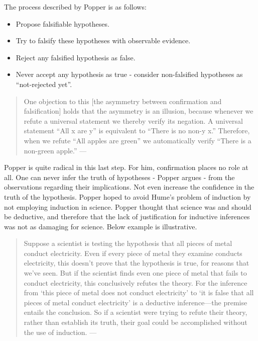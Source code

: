 \documentclass[
  12pt,
]{book}
\providecommand{\tightlist}{%
  \setlength{\itemsep}{0pt}\setlength{\parskip}{0pt}}
\begin{document}
The process described by Popper is as follows:

\begin{itemize}
\tightlist
\item
  Propose falsifiable hypotheses.
\item
  Try to falsify these hypotheses with observable evidence.
\item
  Reject any falsified hypothesis as false.
\item
  Never accept any hypothesis as true - consider non-falsified hypotheses as ``not-rejected yet''.
\end{itemize}

\begin{quote}
One objection to this {[}the asymmetry between confirmation and falsification{]} holds that the asymmetry is an illusion, because whenever we refute a universal statement we thereby verify its negation. A universal statement ``All x are y'' is equivalent to ``There is no non-y x.'' Therefore, when we refute ``All apples are green'' we automatically verify ``There is a non-green apple.'' --- \citep{percival2015confirmation}
\end{quote}

Popper is quite radical in this last step. For him, confirmation places no role at all. One can never infer the truth of hypotheses - Popper argues - from the observations regarding their implications. Not even increase the confidence in the truth of the hypothesis. Popper hoped to avoid Hume's problem of induction by not employing induction in science. Popper thought that science was and should be deductive, and therefore that the lack of justification for inductive inferences was not as damaging for science. Below example is illustrative.

\begin{quote}
Suppose a scientist is testing the hypothesis that all pieces of metal conduct electricity. Even if every piece of metal they examine conducts electricity, this doesn't prove that the hypothesis is true, for reasons that we've seen. But if the scientist finds even one piece of metal that fails to conduct electricity, this conclusively refutes the theory. For the inference from `this piece of metal does not conduct electricity' to `it is false that all pieces of metal conduct electricity' is a deductive inference---the premise entails the conclusion. So if a scientist were trying to refute their theory, rather than establish its truth, their goal could be accomplished without the use of induction. --- \citep{okasha-pos}
\end{quote}
\end{document}
